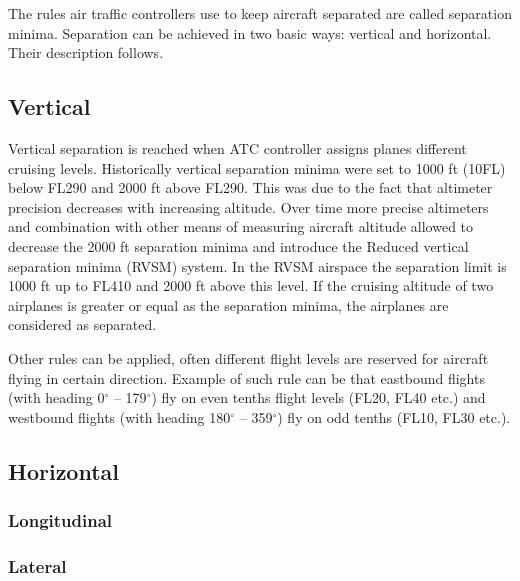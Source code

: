 The rules air traffic controllers use to keep aircraft separated are called separation minima. Separation can be achieved in two basic ways: vertical and horizontal. Their description follows.

\subsection{Vertical}

Vertical separation is reached when ATC controller assigns planes different cruising levels. Historically vertical separation minima were set to 1000 ft (10FL) below FL290 and 2000 ft above FL290. This was due to the fact that altimeter precision decreases with increasing altitude. Over time more precise altimeters and combination with other means of measuring aircraft altitude allowed to decrease the 2000 ft separation minima and introduce the Reduced vertical separation minima (RVSM) system. In the RVSM airspace the separation limit is 1000 ft up to FL410 and 2000 ft above this level. If the cruising altitude of two airplanes is greater or equal as the separation minima, the airplanes are considered as separated. \cite{aim}

Other rules can be applied, often different flight levels are reserved for aircraft flying in certain direction. Example of such rule can be that eastbound flights (with heading 0$^{\circ}$ – 179$^{\circ}$) fly on even tenths flight levels (FL20, FL40 etc.) and westbound flights (with heading 180$^{\circ}$ – 359$^{\circ}$) fly on odd tenths (FL10, FL30 etc.).


\subsection{Horizontal}
\subsubsection{Longitudinal}
\subsubsection{Lateral}




